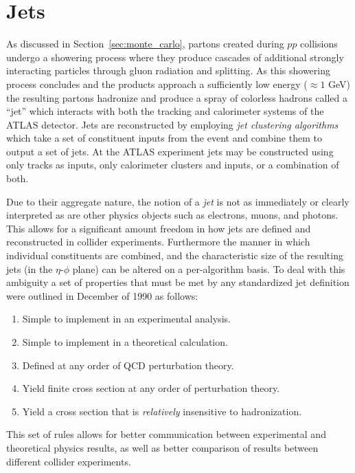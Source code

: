 \graphicspath{{Ch4_Jets/figures/}}

\chapter{Jets}
As discussed in Section~\ref{sec:monte_carlo}, partons created during $pp$ collisions undergo a showering process where they produce cascades of additional strongly interacting particles through gluon radiation and splitting.
As this showering process concludes and the products approach a sufficiently low energy ($\approx 1$ GeV) the resulting partons hadronize and produce a spray of colorless hadrons called a ``jet'' which interacts with both the tracking and calorimeter systems of the ATLAS detector.
Jets are reconstructed by employing \textit{jet clustering algorithms} which take a set of constituent inputs from the event and combine them to output a set of jets.
At the ATLAS experiment jets may be constructed using only tracks as inputs, only calorimeter clusters and inputs, or a combination of both.


Due to their aggregate nature, the notion of a \textit{jet} is not as immediately or clearly interpreted as are other physics objects such as electrons, muons, and photons.
This allows for a significant amount freedom in how jets are defined and reconstructed in collider experiments.
Furthermore the manner in which individual constituents are combined, and the characteristic size of the resulting jets (in the $\eta$-$\phi$ plane) can be altered on a per-algorithm basis.
To deal with this ambiguity a set of properties that must be met by any standardized jet definition were outlined in December of 1990 \cite{Huth:217490} as follows:
\begin{enumerate}
    \itemsep0em 
    \item Simple to implement in an experimental analysis.
    \item Simple to implement in a theoretical calculation.
    \item Defined at any order of QCD perturbation theory.
    \item Yield finite cross section at any order of perturbation theory.
    \item Yield a cross section that is \textit{relatively} insensitive to hadronization.
\end{enumerate}
This set of rules allows for better communication between experimental and theoretical physics results, as well as better comparison of results between different collider experiments.

